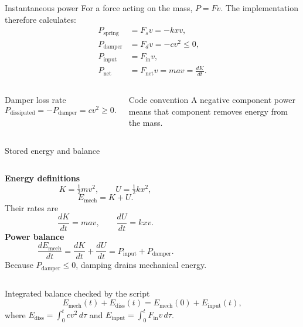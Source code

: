 \documentclass[aspectratio=169,10pt]{beamer}
\begin{document}
\begin{frame}{Instantaneous power}
For a force acting on the mass, $P=Fv$. The implementation therefore calculates:
\[
\begin{aligned}
P_{\mathrm{spring}} &= F_s v=-kxv,\\
P_{\mathrm{damper}} &= F_d v=-cv^2\leq0,\\
P_{\mathrm{input}} &= F_{\mathrm{in}}v,\\
P_{\mathrm{net}} &= F_{\mathrm{net}}v=mav=\frac{dK}{dt}.
\end{aligned}
\]
\vspace{0.5em}
\begin{columns}[T]
\begin{block}{Damper loss rate}
\[
P_{\mathrm{dissipated}}=-P_{\mathrm{damper}}=cv^2\geq0.
\]
\end{block}
\begin{block}{Code convention}
A negative component power means that component removes energy from the mass.
\end{block}
\end{columns}
\end{frame}

\begin{frame}{Stored energy and balance}
\begin{columns}[T]
\textbf{Energy definitions}
\[
K=\tfrac12mv^2,\qquad U=\tfrac12kx^2,
\]
\[
E_{\mathrm{mech}}=K+U.
\]
Their rates are
\[
\frac{dK}{dt}=mav,\qquad \frac{dU}{dt}=kxv.
\]
\textbf{Power balance}
\[
\frac{dE_{\mathrm{mech}}}{dt}
=\frac{dK}{dt}+\frac{dU}{dt}
=P_{\mathrm{input}}+P_{\mathrm{damper}}.
\]
Because $P_{\mathrm{damper}}\leq0$, damping drains mechanical energy.
\end{columns}
\vspace{0.6em}
\begin{alertblock}{Integrated balance checked by the script}
\[
E_{\mathrm{mech}}(t)+E_{\mathrm{diss}}(t)
=E_{\mathrm{mech}}(0)+E_{\mathrm{input}}(t),
\]
where $E_{\mathrm{diss}}=\int_0^t cv^2\,d\tau$ and $E_{\mathrm{input}}=\int_0^t F_{\mathrm{in}}v\,d\tau$.
\end{alertblock}
\end{frame}
\end{document}
